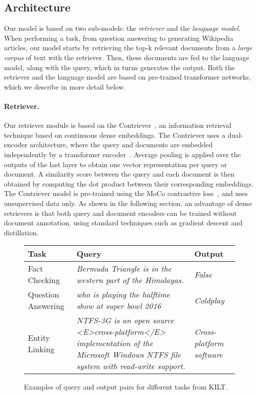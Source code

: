 \documentclass[10pt]{article} \usepackage[preprint]{tmlr}
\begin{document}
\subsection{Architecture}
Our model is based on two sub-models: the \emph{retriever} and the \emph{language model}.
When performing a task, from question answering to generating Wikipedia articles, our model starts by retrieving the top-k relevant documents from a \emph{large corpus} of text with the retriever.
Then, these documents are fed to the language model, along with the query, which in turns generates the output.
Both the retriever and the language model are based on pre-trained transformer networks, which we describe in more detail below.

\paragraph{Retriever.}
Our retriever module is based on the Contriever~\citep{izacard2022unsupervised}, an information retrieval technique based on continuous dense embeddings.
The Contriever uses a dual-encoder architecture, where the query and documents are embedded independently by a transformer encoder~\citep{huang2013learning,karpukhin2020dense}.
Average pooling is applied over the outputs of the last layer to obtain one vector representation per query or document.
A similarity score between the query and each document is then obtained by computing the dot product between their corresponding embeddings.
The Contriever model is pre-trained using the MoCo contrastive loss~\citep{he2020momentum}, and uses unsupervised data only.
As shown in the following section, an advantage of dense retrievers is that both query and document encoders can be trained without document annotation, using standard techniques such as gradient descent and distillation.

\begin{figure}[t]
  \centering
  \begin{tabular}{p{3cm} p{8cm} p{4cm}}
    \toprule
    \textbf{Task} & \textbf{Query} & \textbf{Output} \\
    \midrule
    Fact Checking & \textit{Bermuda Triangle is in the western part of the Himalayas.} & \textit{False} \\
    \midrule
    Question Answering & \textit{who is playing the halftime show at super bowl 2016} & \textit{Coldplay} \\
    \midrule
    Entity Linking & \textit{NTFS-3G is an open source <E>cross-platform</E> implementation of the Microsoft Windows NTFS file system with read-write support.} & \textit{Cross-platform software} \\
    \bottomrule
  \end{tabular}
  \caption{Examples of query and output pairs for different tasks from KILT.}
  \label{fig:kilt_examples}
\end{figure}
\end{document}
